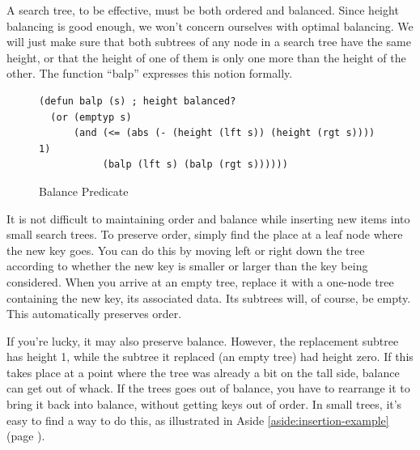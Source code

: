 A search tree, to be effective, must be both ordered and balanced.
Since height balancing is good enough, we won't concern ourselves
with optimal balancing. We will just make sure that both subtrees
of any node in a search tree have the same height, or that the
height of one of them is only one more than the height of the other.
The function ``balp'' expresses this notion formally.

\begin{figure}
\begin{center}
\begin{Verbatim}
(defun balp (s) ; height balanced?
  (or (emptyp s)
      (and (<= (abs (- (height (lft s)) (height (rgt s)))) 1)
           (balp (lft s) (balp (rgt s))))))
\end{Verbatim}
\end{center}
\caption{Balance Predicate}
\label{fig:balance-and-size}
\end{figure}

It is not difficult to maintaining order and balance while
inserting new items into small search trees.
To preserve order, simply find the place at a leaf node
where the new key goes.
You can do this by moving left or right down the tree according
to whether the new key is smaller or larger than the key being
considered. When you arrive at an empty tree, replace it with a
one-node tree containing the new key, its
associated data. Its subtrees will, of course, be empty.
This automatically preserves order.

If you're lucky, it may also preserve balance.
However, the replacement subtree has height 1, while the subtree it
replaced (an empty tree) had height zero. If this takes place
at a point where the tree was already a bit on the tall side,
balance can get out of whack.
If the trees goes out of balance, you have to rearrange it
to bring it back into balance, without getting keys out of order.
In small trees, it's easy to find a way to do this,
as illustrated in Aside \ref{aside:insertion-example}
(page \pageref{aside:insertion-example}).

